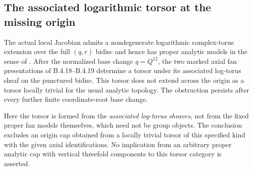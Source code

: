 \subsection{The associated logarithmic torsor at the missing origin}

\begin{proposition}
\label{push:B424}
The actual local Jacobian admits a nondegenerate logarithmic
complex-torus extension over the full $(q,r)$ bidisc and hence
has proper analytic models in the sense of
\citet{KKN2008Root}. After the normalized base change
$q=Q^{12}$, the two marked axial fan presentations of
B.4.18--B.4.19 determine a torsor under its associated
log-torus sheaf on the punctured bidisc. This torsor does
not extend across the origin as a torsor locally trivial
for the usual analytic topology. The obstruction persists
after every further finite coordinate-root base change.

Here the torsor is formed from the \emph{associated
log-torus sheaves}, not from the fixed proper fan models
themselves, which need not be group objects. The conclusion
excludes an origin cap obtained from a locally trivial
torsor of this specified kind with the given axial
identifications. No implication from an arbitrary proper
analytic cap with vertical threefold components to this
torsor category is asserted.
\end{proposition}

